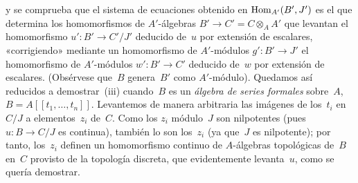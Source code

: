 y se comprueba que el sistema de ecuaciones obtenido en $\operatorname{Hom}_{A'}(B',J')$ es el que determina los homomorfismos de $A'$-álgebras $B'\to C'=C\otimes_A A'$ que levantan el homomorfismo $u'\colon B'\to C'/J'$ deducido de~$u$ por extensión de escalares, «corrigiendo» mediante un homomorfismo de $A'$-módulos $g'\colon B'\to J'$ el homomorfismo de $A'$-módulos $w'\colon B'\to C'$ deducido de~$w$ por extensión de escalares. (Obsérvese que~$B$ genera~$B'$ como $A'$-módulo). Quedamos así reducidos a demostrar~(iii) cuando~$B$ es un \emph{álgebra de series formales} sobre~$A$, $B=A[[t_1,\dots,t_n]]$. Levantemos de manera arbitraria las imágenes de los~$t_i$ en~$C/J$ a elementos~$z_i$ de~$C$. Como los $z_i$ módulo~$J$ son nilpotentes (pues $u\colon B\to C/J$ es continua), también lo son los~$z_i$ (ya que~$J$ es nilpotente); por tanto, los~$z_i$ definen un homomorfismo continuo de $A$-álgebras topológicas de~$B$ en~$C$ provisto de la topología discreta, que evidentemente levanta~$u$, como se quería demostrar.
